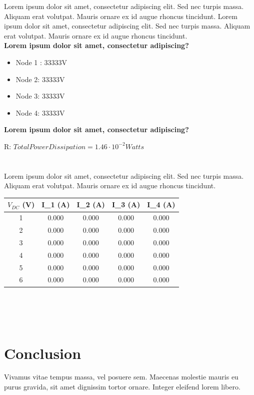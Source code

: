 \documentclass[article]{IEEEtran}
\begin{document}
Lorem ipsum dolor sit amet, consectetur adipiscing elit. Sed nec turpis massa. Aliquam erat volutpat. Mauris ornare ex id augue rhoncus tincidunt. 
Lorem ipsum dolor sit amet, consectetur adipiscing elit. Sed nec turpis massa. Aliquam erat volutpat. Mauris ornare ex id augue rhoncus tincidunt. \\

\textbf{Lorem ipsum dolor sit amet, consectetur adipiscing?}

\begin{itemize}
    \item Node 1 : 33333V
    \item Node 2:  33333V
    \item Node 3:  33333V
    \item Node 4:  33333V
\end{itemize}

\textbf{Lorem ipsum dolor sit amet, consectetur adipiscing?}

R: $Total Power Dissipation = 1.46 \cdot 10^{-2} Watts$
\\
\\
\\

Lorem ipsum dolor sit amet, consectetur adipiscing elit. Sed nec turpis massa. Aliquam erat volutpat. Mauris ornare ex id augue rhoncus tincidunt.
\begin{center}
    

\begin{tabular}{|c|c|c|c|c|}
    \hline
    $V_{DC}$ (V) & I_1 (A) & I_2 (A) & I_3 (A) & I_4 (A) \\
    \hline
     1 & 0.000 & 0.000 & 0.000 & 0.000 \\
    \hline
     2 & 0.000 & 0.000 & 0.000 & 0.000 \\
    \hline
     3 & 0.000 & 0.000 & 0.000 & 0.000 \\
    \hline 
     4 & 0.000 & 0.000 & 0.000 & 0.000 \\
     \hline
     5 & 0.000 & 0.000 & 0.000 & 0.000 \\
     \hline
     6 & 0.000 & 0.000 & 0.000 & 0.000 \\
     \hline
     
\end{tabular}
\end{center}

\\
\\
\\

\section*{Conclusion}
Vivamus vitae tempus massa, vel posuere sem. Maecenas molestie mauris eu purus gravida, sit amet dignissim tortor ornare. Integer eleifend lorem libero.
\\
\end{document}
